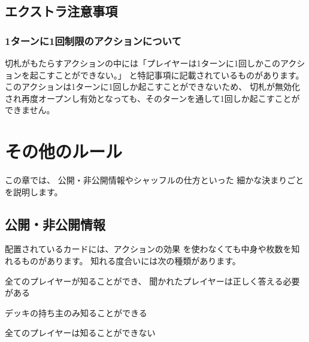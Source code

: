 \documentclass[letterpaper,10pt,dvipdfmx]{sphinxmanual}
\begin{document}
\subsection{エクストラ注意事項}
\label{\detokenize{common/common:id41}}

\subsubsection{1ターンに1回制限のアクションについて}
\label{\detokenize{common/common:id42}}
\sphinxAtStartPar
切札がもたらすアクションの中には「プレイヤーは1ターンに1回しかこのアクションを起こすことができない。」
と特記事項に記載されているものがあります。
このアクションは1ターンに1回しか起こすことができないため、
切札が無効化され再度オープンし有効となっても、そのターンを通して1回しか起こすことができません。


\section{その他のルール}
\label{\detokenize{common/common:id43}}
\sphinxAtStartPar
この章では、
公開・非公開情報やシャッフルの仕方といった
細かな決まりごとを説明します。


\subsection{公開・非公開情報}
\label{\detokenize{common/common:id44}}
\sphinxAtStartPar
配置されているカードには、アクションの効果
を使わなくても中身や枚数を知れるものがあります。
知れる度合いには次の種類があります。
\begin{description}
\sphinxAtStartPar
全てのプレイヤーが知ることができ、
聞かれたプレイヤーは正しく答える必要がある

\sphinxAtStartPar
デッキの持ち主のみ知ることができる

\sphinxAtStartPar
全てのプレイヤーは知ることができない

\end{description}
\end{document}
